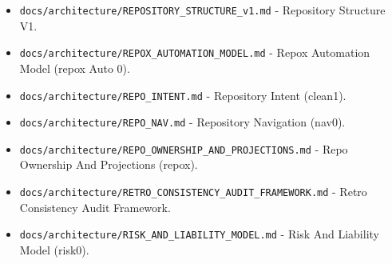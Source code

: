 \documentclass[9pt,a4paper,openany]{book}
\begin{document}
\begin{itemize}
\item \texttt{docs/\allowbreak{}architecture/\allowbreak{}REPOSITORY\_\allowbreak{}STRUCTURE\_\allowbreak{}v1.\allowbreak{}md} -\allowbreak{} Repository Structure V1.\allowbreak{}
\end{itemize}

\begin{itemize}
\item \texttt{docs/\allowbreak{}architecture/\allowbreak{}REPOX\_\allowbreak{}AUTOMATION\_\allowbreak{}MODEL.\allowbreak{}md} -\allowbreak{} Repox Automation Model (repox Auto 0).\allowbreak{}
\end{itemize}

\begin{itemize}
\item \texttt{docs/\allowbreak{}architecture/\allowbreak{}REPO\_\allowbreak{}INTENT.\allowbreak{}md} -\allowbreak{} Repository Intent (clean1).\allowbreak{}
\end{itemize}

\begin{itemize}
\item \texttt{docs/\allowbreak{}architecture/\allowbreak{}REPO\_\allowbreak{}NAV.\allowbreak{}md} -\allowbreak{} Repository Navigation (nav0).\allowbreak{}
\end{itemize}

\begin{itemize}
\item \texttt{docs/\allowbreak{}architecture/\allowbreak{}REPO\_\allowbreak{}OWNERSHIP\_\allowbreak{}AND\_\allowbreak{}PROJECTIONS.\allowbreak{}md} -\allowbreak{} Repo Ownership And Projections (repox).\allowbreak{}
\end{itemize}

\begin{itemize}
\item \texttt{docs/\allowbreak{}architecture/\allowbreak{}RETRO\_\allowbreak{}CONSISTENCY\_\allowbreak{}AUDIT\_\allowbreak{}FRAMEWORK.\allowbreak{}md} -\allowbreak{} Retro Consistency Audit Framework.\allowbreak{}
\end{itemize}

\begin{itemize}
\item \texttt{docs/\allowbreak{}architecture/\allowbreak{}RISK\_\allowbreak{}AND\_\allowbreak{}LIABILITY\_\allowbreak{}MODEL.\allowbreak{}md} -\allowbreak{} Risk And Liability Model (risk0).\allowbreak{}
\end{itemize}
\end{document}
